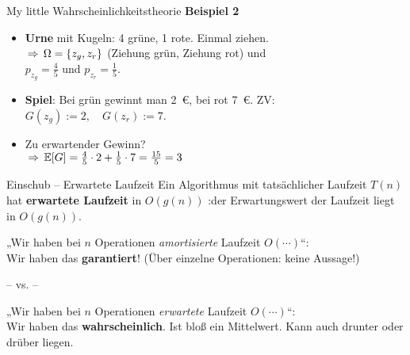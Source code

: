 \begin{frame}{My little Wahrscheinlichkeitstheorie} 
	\textbf{Beispiel 2} \\%
	\begin{itemize}
		\item \textbf{Urne} mit Kugeln: 4 grüne, 1 rote. Einmal ziehen. \\ \pause
		$\impl \Omega = \{z_g, z_r\}$ \quad (Ziehung grün, Ziehung rot) und \\ \pause
		$ p_{z_g} = \frac{4}{5}$ und $p_{z_r} = \frac{1}{5}$.
		\item \textbf{Spiel}:  Bei grün gewinnt man 2~€, bei rot 7~€. \quad ZV: \\ \pause
		$G(z_g) := 2, \quad  G(z_r) := 7$.
		\item Zu erwartender Gewinn? \\ \pause
		$\impl \E[G] = \frac{4}{5} \cdot 2 + \frac{1}{5} \cdot 7 = \fract 15/5 = 3$
	\end{itemize}
\end{frame}

\begin{frame}{Einschub – Erwartete Laufzeit}
	Ein Algorithmus mit tatsächlicher Laufzeit $T(n)$ hat \textbf{erwartete Laufzeit} in $O(g(n))$ :\gdw der Erwartungswert der Laufzeit liegt in $O(g(n))$. \\
	\pause
	\begin{center}
		{\large {}} 
	\end{center}
	„Wir haben bei $n$ Operationen \emph{amortisierte} Laufzeit $O(\cdots)$“: \\
	\impl Wir haben das \textbf{garantiert}! {\small (Über einzelne Operationen: keine Aussage!)} \\
	\vspace{-.7\baselineskip}
	\begin{center}
		-- vs. -- 
	\end{center}
	\vspace{-.7\baselineskip}
	„Wir haben bei $n$ Operationen \emph{erwartete} Laufzeit $O(\cdots)$“: \\
	\impl Wir haben das \textbf{wahrscheinlich}. Ist bloß ein Mittelwert. Kann auch drunter oder drüber liegen.
\end{frame}

